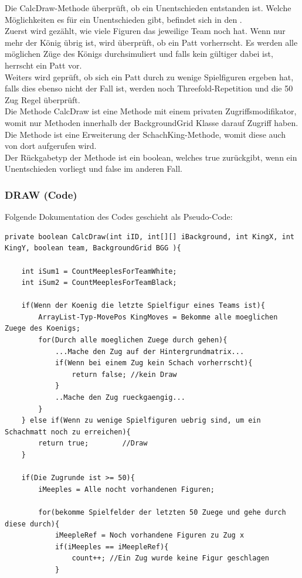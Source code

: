 \documentclass[12pt,a4paper]{article}
\begin{document}
{Die CalcDraw-Methode überprüft, ob ein Unentschieden entstanden ist. Welche Möglichkeiten es für ein Unentschieden gibt, befindet sich in den . \\
Zuerst wird gezählt, wie viele Figuren das jeweilige Team noch hat. Wenn nur mehr der König übrig ist, wird überprüft, ob ein Patt vorherrscht. Es werden alle möglichen Züge des Königs durchsimuliert und falls kein gültiger dabei ist, herrscht ein Patt vor. \\
Weiters wird geprüft, ob sich ein Patt durch zu wenige Spielfiguren ergeben hat, falls dies ebenso nicht der Fall ist, werden noch Threefold-Repetition und die 50 Zug Regel überprüft. \\[2ex]
Die Methode CalcDraw ist eine Methode mit einem privaten Zugriffsmodifikator, womit nur Methoden innerhalb der BackgroundGrid Klasse darauf Zugriff haben. Die Methode ist eine Erweiterung der SchachKing-Methode, womit diese auch von dort aufgerufen wird. \\
Der Rückgabetyp der Methode ist ein boolean, welches true zurückgibt, wenn ein Unentschieden vorliegt und false im anderen Fall.

 \subsubsection{DRAW (Code)}
 \label{SUBSUBSEC:DRAW-CODE}

Folgende Dokumentation des Codes geschieht als Pseudo-Code:

\textbf{\lstset{language=Java}}
\begin{lstlisting}
private boolean CalcDraw(int iID, int[][] iBackground, int KingX, int KingY, boolean team, BackgroundGrid BGG ){
	
	int iSum1 = CountMeeplesForTeamWhite;
	int iSum2 = CountMeeplesForTeamBlack;
	
	if(Wenn der Koenig die letzte Spielfigur eines Teams ist){
		ArrayList-Typ-MovePos KingMoves = Bekomme alle moeglichen Zuege des Koenigs;
		for(Durch alle moeglichen Zuege durch gehen){ 
			...Mache den Zug auf der Hintergrundmatrix...
			if(Wenn bei einem Zug kein Schach vorherrscht){
				return false; //kein Draw
			}		
			..Mache den Zug rueckgaengig...
		}		
	} else if(Wenn zu wenige Spielfiguren uebrig sind, um ein Schachmatt noch zu erreichen){
		return true;		//Draw
	}
	
	if(Die Zugrunde ist >= 50){
		iMeeples = Alle nocht vorhandenen Figuren;
		
		for(bekomme Spielfelder der letzten 50 Zuege und gehe durch diese durch){
			iMeepleRef = Noch vorhandene Figuren zu Zug x
			if(iMeeples == iMeepleRef){
				count++; //Ein Zug wurde keine Figur geschlagen
			}
			

\end{lstlisting}}
\end{document}
